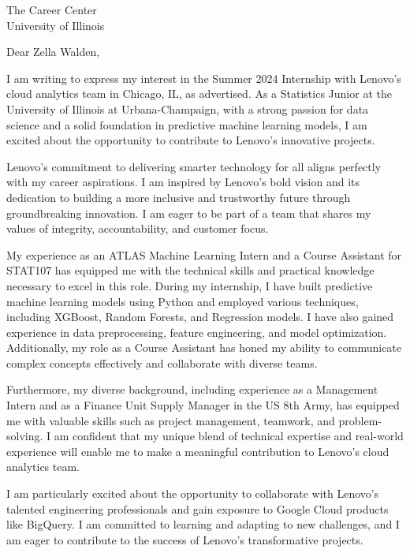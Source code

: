 \documentclass{letter}
\begin{document}
\begin{letter}{The Career Center\\
University of Illinois}


\opening{Dear Zella Walden,}




I am writing to express my interest in the Summer 2024 Internship 
with Lenovo's cloud analytics team in Chicago, IL, as advertised.
As a Statistics Junior at the University of Illinois at Urbana-Champaign, 
with a strong passion
for data science and a solid foundation in predictive machine 
learning models, I am excited about the opportunity to contribute 
to Lenovo's innovative projects.

Lenovo's commitment to delivering smarter technology for all aligns
perfectly with my career aspirations. I am inspired by Lenovo's bold 
vision and its dedication to building a more inclusive and trustworthy 
future through groundbreaking innovation. I am eager to be part of a team 
that shares my values of integrity, accountability, and customer focus.

My experience as an ATLAS Machine Learning Intern and a Course Assistant
for STAT107 has equipped me with the technical skills and practical
knowledge necessary to excel in this role. During my internship, I have
built predictive machine learning models using Python and employed 
various techniques, including XGBoost, Random Forests, and Regression 
models. I have also gained experience in data preprocessing, feature 
engineering, and model optimization. Additionally, my role as a Course 
Assistant has honed my ability to communicate complex concepts effectively 
and collaborate with diverse teams.

Furthermore, my diverse background, including experience as a Management 
Intern and as a Finance Unit Supply Manager in the US 8th Army, has equipped 
me with valuable skills such as project management, teamwork, and problem-solving.
I am confident that my unique blend of technical expertise and real-world
experience will enable me to make a meaningful contribution to Lenovo's
cloud analytics team.

I am particularly excited about the opportunity to collaborate with 
Lenovo's talented engineering professionals and gain exposure to Google 
Cloud products like BigQuery. I am committed to learning and adapting to 
new challenges, and I am eager to contribute to the success of Lenovo's
transformative projects.


\end{letter}
\end{document}
